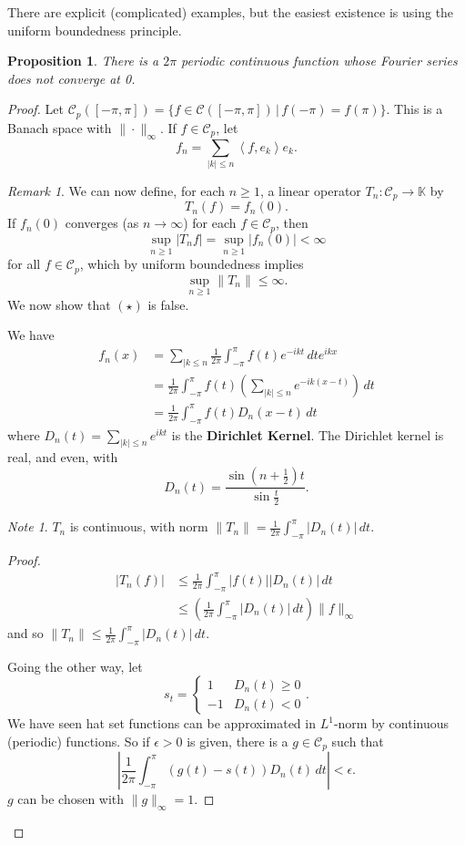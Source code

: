 \documentclass[10pt, oneside, reqno]{amsart}
\theoremstyle{plain}%
\newtheorem{prop}[thm]{Proposition}
\theoremstyle{definition}
\theoremstyle{remark}
\newtheorem*{rem}{Remark}
\newtheorem*{note}{Note}
\newcommand{\given}{ \, | \,}
\newcommand{\K}{\mathbb{K}}
\newcommand{\iprod}[1]{\left\langle #1 \right\rangle}
\begin{document}
There are explicit (complicated) examples, but the easiest existence is using the uniform boundedness principle.  

\begin{prop}
	There is a $2\pi$ periodic continuous function whose Fourier series does not converge at 0.  
\end{prop}
\begin{proof}
	Let $\mathcal{C}_p([-\pi, \pi]) = \{ f \in \mathcal C([-\pi, \pi]) \given f(-\pi) = f(\pi) \}.$  This is a Banach space with $\| \cdot \|_\infty $.  If $f \in \mathcal C_p$, let \[
		f_n = \sum_{|k | \leq n} \iprod{f, e_k} e_k.
	\]
	
\begin{rem}
	We can now define, for each $n \geq 1$, a linear operator $T_n : \mathcal C_p \rightarrow \K$ by \[
		T_n(f) = f_n(0). 
	\]  If $f_n(0)$ converges (as $ n \rightarrow \infty$) for each $f \in \mathcal C_p$, then \[
		\sup_{n \geq 1} |T_n f | = \sup_{n \geq 1} |f_n(0)| < \infty
	\] for all $f \in \mathcal C_p$, which by uniform boundedness implies \[
		\sup_{n \geq 1} \| T_n \| \leq \infty \tag{$\star$}.
	\]  
	We now show that $(\star)$ is false.
\end{rem}
We have \begin{align*}
	f_n(x) 	&= \sum_{| k \leq n} \frac{1}{2 \pi} \int_{-\pi}^\pi f(t) e^{-ikt} \, dt e^{ikx}  \\
			&= \frac{1}{2\pi} \int_{-\pi}^\pi f(t) \left( \sum_{|k| \leq n} e^{-ik(x-t)} \right) \, dt \\
			&= \frac{1}{2 \pi} \int_{-\pi}^\pi f(t) D_n(x-t) \, dt 
\end{align*} where $D_n(t) = \sum_{|k| \leq n} e^{ikt}$ is the \textbf{Dirichlet Kernel}.  The Dirichlet kernel is real, and even, with \[
	D_n(t) = \frac{\sin(n+\frac{1}{2}) t}{\sin \frac{t}{2}}.  
\]  

\begin{note}
	$T_n$ is continuous, with norm $\| T_n \| = \frac{1}{2\pi} \int_{-\pi}^\pi |D_n(t) | \, dt$.
\end{note}
\begin{proof}
	\begin{align*}
		|T_n(f)| &\leq \frac{1}{2\pi} \int_{-\pi}^\pi |f(t)| |D_n(t)| \, dt \\
				&\leq \left( \frac{1}{2\pi} \int_{-\pi}^\pi |D_n(t)| \, dt \right) \| f\|_\infty
	\end{align*} and so $\|T_n \| \leq \frac{1}{2\pi} \int_{-\pi}^\pi |D_n(t)| \, dt$. 
	
	Going the other way, let \[
		s_t = \begin{cases}
		1 &D_n(t) \geq 0 \\
		-1 &D_n(t) < 0
		\end{cases}.
	\]  We have seen hat set functions can be approximated in $L^1$-norm by continuous (periodic) functions.  So if $\epsilon > 0$ is given, there is a $g \in \mathcal C_p$ such that \[
		\left| \frac{1}{2\pi} \int_{-\pi}^\pi (g(t) - s(t))D_n(t) \, dt \right| < \epsilon. 
	\] $g$ can be chosen with $\| g \|_\infty = 1$.  
	

\end{proof}
\end{proof}
\end{document}
